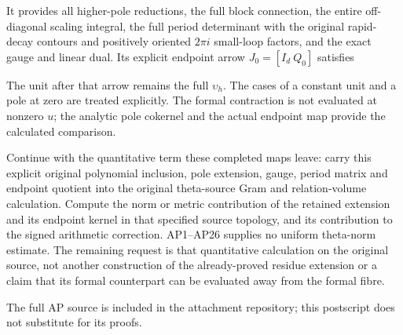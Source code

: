 
It provides all higher-pole reductions, the full block connection, the
entire off-diagonal scaling integral, the full period determinant with
the original rapid-decay contours and positively oriented \(2\pi i\)
small-loop factors, and the exact gauge and linear dual. Its explicit
endpoint arrow \(J_0=[I_d\ Q_0]\) satisfies


The unit after that arrow remains the full \(\upsilon_h\). The cases of
a constant unit and a pole at zero are treated explicitly. The formal
contraction is not evaluated at nonzero \(u\); the analytic pole
cokernel and the actual endpoint map provide the calculated comparison.

Continue with the quantitative term these completed maps leave: carry
this explicit original polynomial inclusion, pole extension, gauge,
period matrix and endpoint quotient into the original theta-source Gram
and relation-volume calculation. Compute the norm or metric contribution
of the retained extension and its endpoint kernel in that specified
source topology, and its contribution to the signed arithmetic
correction. AP1--AP26 supplies no uniform theta-norm estimate. The
remaining request is that quantitative calculation on the original
source, not another construction of the already-proved residue extension
or a claim that its formal counterpart can be evaluated away from the
formal fibre.

The full AP source is included in the attachment repository; this
postscript does not substitute for its proofs.


